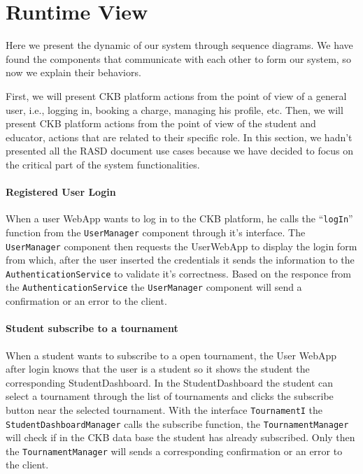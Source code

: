 \section{Runtime View}
\label{sec:runtime_view}%
Here we present the dynamic of our system through sequence diagrams.
We have found the components that communicate with each other to form our system, so now we explain their behaviors.

First, we will present CKB platform actions from the point of view of a general user, i.e., logging in, booking a charge, managing his profile, etc.
Then, we will present CKB platform actions from the point of view of the student and educator, actions that are related to their specific role.
In this section, we hadn't presented all the RASD document use cases because we have decided to focus on the critical part of the system functionalities.

\paragraph{Registered User Login}
When a user WebApp wants to log in to the CKB platform, he calls the ``\verb|logIn|'' function from the \verb|UserManager| component through it's interface.
The \verb|UserManager| component then requests the UserWebApp to display the login form from which, after the user inserted the credentials it sends the information to the
\verb|AuthenticationService| to validate it's correctness. Based on the responce from the \verb|AuthenticationService| the \verb|UserManager| component will send a confirmation or an error to the client.

\paragraph{Student subscribe to a tournament}
When a student wants to subscribe to a open tournament, the User WebApp after login knows that the user is a student so it shows the student the corresponding StudentDashboard.
In the StudentDashboard the student can select a tournament through the list of tournaments and clicks the subscribe button near the selected tournament.
With the interface \verb|TournamentI| the \verb|StudentDashboardManager| calls the subscribe function, the \verb|TournamentManager| will check if in the CKB data base the student has already subscribed.
Only then the \verb|TournamentManager| will sends a corresponding confirmation or an error to the client.

